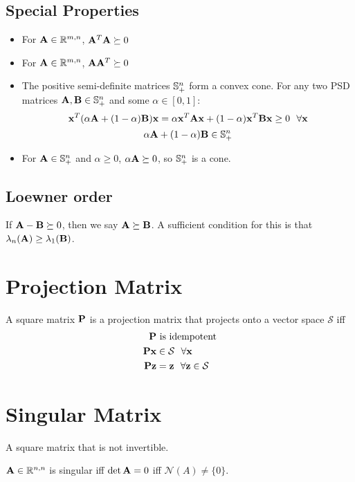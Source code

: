 \subsection*{Special Properties}
\begin{itemize}
\item For $\mathbf{A}\in\mathbb{R}^{m,n}$, $\mathbf{A}^T\mathbf{A}\succeq0$
\item For $\mathbf{A}\in\mathbb{R}^{m,n}$, $\mathbf{A}\mathbf{A}^T\succeq0$
\item The positive semi-definite matrices $\mathbb{S}^n_+$ form a convex cone. For any two PSD matrices $\mathbf{A},\mathbf{B}\in\mathbb{S}^n_+$ and some $\alpha\in[0,1]$:
\begin{equation}
\mathbf{x}^T(\alpha\mathbf{A}+(1-\alpha)\mathbf{B})\mathbf{x}=\alpha \mathbf{x}^T\mathbf{A}\mathbf{x}+(1-\alpha)\mathbf{x}^T\mathbf{B}\mathbf{x}\ge0~~\forall\mathbf{x}
\end{equation}
\begin{equation}
\alpha\mathbf{A}+(1-\alpha)\mathbf{B}\in\mathbb{S}^n_+
\end{equation}
\item For $\mathbf{A}\in\mathbb{S}^n_+$ and $\alpha\ge0$, $\alpha\mathbf{A}\succeq0$, so $\mathbb{S}^n_+$ is a cone.
\end{itemize}

\subsection{Loewner order}
If $\mathbf{A}-\mathbf{B}\succeq 0$, then we say $\mathbf{A}\succeq \mathbf{B}$. A sufficient condition for this is that $\lambda_n(\mathbf{A})\ge\lambda_1(\mathbf{B})$.



\section{Projection Matrix}
A square matrix $\mathbf{P}$ is a projection matrix that projects onto a vector space $\mathcal{S}$ iff
\begin{align}
\mathbf{P}&~\textrm{is idempotent} \\
\mathbf{P}\mathbf{x}&\in\mathcal{S}~~\forall\mathbf{x} \\
\mathbf{P}\mathbf{z}&=\mathbf{z}~~\forall\mathbf{z}\in\mathcal{S}
\end{align}





\section{Singular Matrix}
A square matrix that is not invertible.

$\mathbf{A}\in\mathbb{R}^{n,n}$ is singular iff $\det \mathbf{A}=0$ iff $\mathcal{N}(A)\ne\{0\}$.


